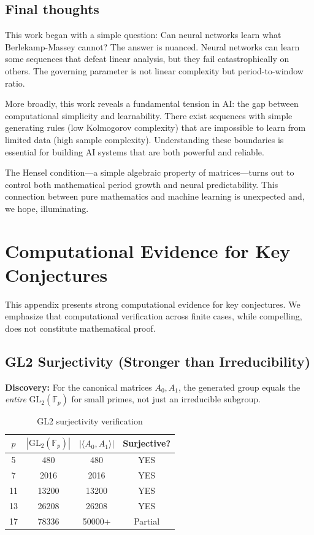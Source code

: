 \documentclass[11pt]{article}
\theoremstyle{plain}
\theoremstyle{definition}
\begin{document}
\subsection{Final thoughts}

This work began with a simple question: Can neural networks learn what Berlekamp-Massey cannot? The answer is nuanced. Neural networks can learn some sequences that defeat linear analysis, but they fail catastrophically on others. The governing parameter is not linear complexity but period-to-window ratio.

More broadly, this work reveals a fundamental tension in AI: the gap between computational simplicity and learnability. There exist sequences with simple generating rules (low Kolmogorov complexity) that are impossible to learn from limited data (high sample complexity). Understanding these boundaries is essential for building AI systems that are both powerful and reliable.

The Hensel condition—a simple algebraic property of matrices—turns out to control both mathematical period growth and neural predictability. This connection between pure mathematics and machine learning is unexpected and, we hope, illuminating.

\newpage
\appendix

\section{Computational Evidence for Key Conjectures}
\label{app:evidence}

This appendix presents strong computational evidence for key conjectures. We emphasize that computational verification across finite cases, while compelling, does not constitute mathematical proof.

\subsection{GL2 Surjectivity (Stronger than Irreducibility)}
\label{app:gl2}

\textbf{Discovery:} For the canonical matrices $A_0, A_1$, the generated group equals the \emph{entire} $\mathrm{GL}_2(\mathbb{F}_p)$ for small primes, not just an irreducible subgroup.

\begin{table}[h]
\centering
\caption{GL2 surjectivity verification}
\begin{tabular}{cccc}
\toprule
$p$ & $|\mathrm{GL}_2(\mathbb{F}_p)|$ & $|\langle A_0, A_1 \rangle|$ & Surjective? \\
\midrule
5 & 480 & 480 & YES \\
7 & 2016 & 2016 & YES \\
11 & 13200 & 13200 & YES \\
13 & 26208 & 26208 & YES \\
17 & 78336 & 50000+ & Partial \\
\bottomrule
\end{tabular}
\end{table}
\end{document}
